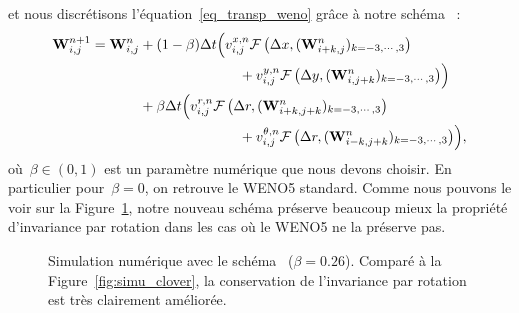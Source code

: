 \documentclass[main.tex]{subfiles}
\begin{document}
et nous discrétisons l'équation~\eqref{eq_transp_weno} grâce à notre schéma \twinweno\ : 
\begin{equation}\label{eq:twin-WENO5}
  \begin{split}
\W^{n+1}_{i,j} =\W^n_{i,j} &+ (1-\beta)\Delta t \Bigl(v_{i,j}^{x,n}
\mathcal{F}\left(\Delta x,(\W^n_{i+k,j})_{k=-3,\cdots, 3}\right) \\
&\hspace{25mm} + v_{i,j}^{y,n} \mathcal{F}\left(\Delta y,(\W^n_{i,j+k})_{k=-3,\cdots,3}\right)\Bigr)\\
&+\beta\Delta t \Bigl(v_{i,j}^{r,n}
\mathcal{F}\left(\Delta r,(\W^n_{i+k,j+k})_{k=-3,\cdots, 3}\right) \\
& \hspace{25mm} + v_{i,j}^{\theta,n} \mathcal{F}\left(\Delta r,(\W^n_{i-k,j+k})_{k=-3,\cdots, 3}\right)\Bigr),
  \end{split}
\end{equation}
où~$\beta\in(0,1)$ est un paramètre numérique que nous devons choisir. 
En particulier pour~$\beta=0$, on retrouve le WENO5 standard. 
Comme nous pouvons le voir sur la Figure~\ref{fig:compWENO5}, notre nouveau schéma préserve beaucoup mieux la propriété d'invariance par rotation dans les cas où le WENO5 ne la préserve pas.

\begin{figure}[!htb]
\caption{Simulation numérique avec le schéma \twinweno\  ($\beta=0.26$).  
Comparé à la Figure~\ref{fig:simu_clover}, la conservation de l'invariance par rotation est très clairement améliorée. 
}\label{fig:compWENO5}
\end{figure}
\end{document}
